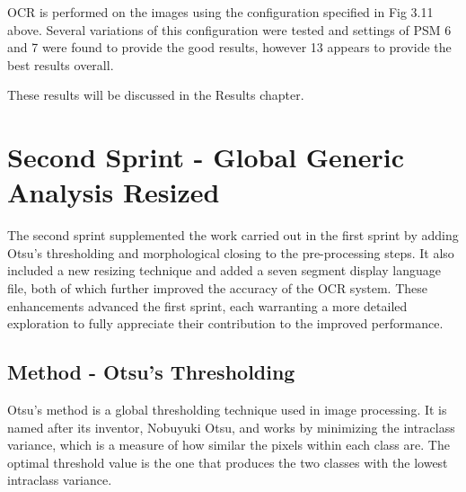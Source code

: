 OCR is performed on the images using the configuration specified in Fig 3.11 above. Several variations of this configuration were tested and settings of PSM 6 and 7 were found to provide the good results, however 13 appears to provide the best results overall.

These results will be discussed in the Results chapter.

\newpage

\section{Second Sprint - Global Generic Analysis Resized}

The second sprint supplemented the work carried out in the first sprint by adding Otsu's thresholding and morphological closing to the pre-processing steps. It also included a new resizing technique and added a seven segment display language file, both of which further improved the accuracy of the OCR system. These enhancements advanced the first sprint, each warranting a more detailed exploration to fully appreciate their contribution to the improved performance.

\subsection*{Method - Otsu's Thresholding}

Otsu's method is a global thresholding technique used in image processing. It is named after its inventor, Nobuyuki Otsu, and works by minimizing the intraclass variance, which is a measure of how similar the pixels within each class are. The optimal threshold value is the one that produces the two classes with the lowest intraclass variance. \cite{garciaDetectionClassificationPathogens2021}

